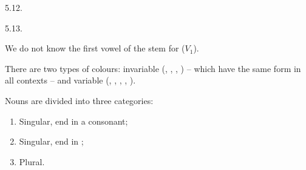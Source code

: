 \begin{refsection}
\begin{practiceproblemsolution}{5.12. \langnameAfrihili}
\end{practiceproblemsolution}
\begin{practiceproblemsolution}{5.13. \langnameMaltese}

\begin{solutions}[label=Solution 5.13\alph*]
    \item \begin{enumerate}[label = (\arabic*)]
        \begin{multicols}{3}
            \item {}
            \item {}
            \item {}
            \item {}
            \item {}
            \item {}
            \item {}
            \item {}
            \item {}
            \item {}
            \item {}
            \item {}
            \item {}
            \item {}
            \item {}
        \end{multicols}
    \end{enumerate}
    \item We do not know the first vowel of the stem for  ($V_1$).
\end{solutions}

\begin{sloppypar}
 There are two types of colours: invariable (, , , ) -- which have the same form in all contexts -- and variable (, , , , ).
\end{sloppypar}

Nouns are divided into three categories:
\begin{enumerate}[label = Cat. \Roman*., leftmargin = 7em,noitemsep]
    \item Singular, end in a consonant;
    \item Singular, end in ;
    \item Plural. 
\end{enumerate}


\end{practiceproblemsolution}
\end{refsection}
